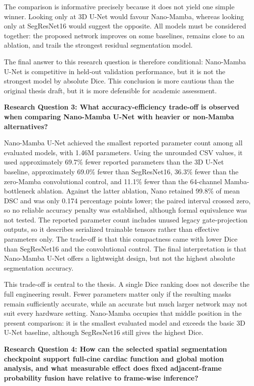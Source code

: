 The comparison is informative precisely because it does not yield one simple winner. Looking only at 3D U-Net would favour Nano-Mamba, whereas looking only at SegResNet16 would suggest the opposite. All models must be considered together: the proposed network improves on some baselines, remains close to an ablation, and trails the strongest residual segmentation model.

The final answer to this research question is therefore conditional: Nano-Mamba U-Net is competitive in held-out validation performance, but it is not the strongest model by absolute Dice. This conclusion is more cautious than the original thesis draft, but it is more defensible for academic assessment.

\textbf{Research Question 3: What accuracy-efficiency trade-off is observed when comparing Nano-Mamba U-Net with heavier or non-Mamba alternatives?}

Nano-Mamba U-Net achieved the smallest reported parameter count among all evaluated models, with 1.46M parameters. Using the unrounded CSV values, it used approximately 69.7\% fewer reported parameters than the 3D U-Net baseline, approximately 69.0\% fewer than SegResNet16, 36.3\% fewer than the zero-Mamba convolutional control, and 11.1\% fewer than the 64-channel Mamba-bottleneck ablation. Against the latter ablation, Nano retained 99.8\% of mean DSC and was only 0.174 percentage points lower; the paired interval crossed zero, so no reliable accuracy penalty was established, although formal equivalence was not tested. The reported parameter count includes unused legacy gate-projection outputs, so it describes serialized trainable tensors rather than effective parameters only. The trade-off is that this compactness came with lower Dice than SegResNet16 and the convolutional control. The final interpretation is that Nano-Mamba U-Net offers a lightweight design, but not the highest absolute segmentation accuracy.

This trade-off is central to the thesis. A single Dice ranking does not describe the full engineering result. Fewer parameters matter only if the resulting masks remain sufficiently accurate, while an accurate but much larger network may not suit every hardware setting. Nano-Mamba occupies that middle position in the present comparison: it is the smallest evaluated model and exceeds the basic 3D U-Net baseline, although SegResNet16 still gives the highest Dice.

\textbf{Research Question 4: How can the selected spatial segmentation checkpoint support full-cine cardiac function and global motion analysis, and what measurable effect does fixed adjacent-frame probability fusion have relative to frame-wise inference?}

